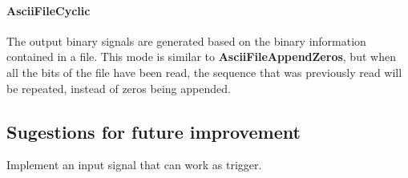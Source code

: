 \paragraph{AsciiFileCyclic}
The output binary signals are generated based on the binary information contained in a file. This mode is similar to \textbf{AsciiFileAppendZeros}, but when all the bits of the file have been read, the sequence that was previously read will be repeated, instead of zeros being appended.

\subsection*{Sugestions for future improvement}

Implement an input signal that can work as trigger.

